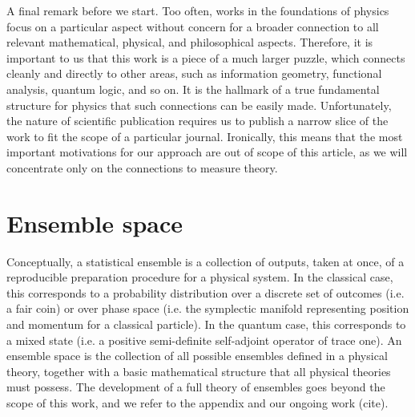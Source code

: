 \documentclass[10pt,twocolumn, nofootinbib]{revtex4-2}
\begin{document}
A final remark before we start. Too often, works in the foundations of physics focus on a particular aspect without concern for a broader connection to all relevant mathematical, physical, and philosophical aspects. Therefore, it is important to us that this work is a piece of a much larger puzzle, which connects cleanly and directly to other areas, such as information geometry, functional analysis, quantum logic, and so on. It is the hallmark of a true fundamental structure for physics that such connections can be easily made. Unfortunately, the nature of scientific publication requires us to publish a narrow slice of the work to fit the scope of a particular journal. Ironically, this means that the most important motivations for our approach are out of scope of this article, as we will concentrate only on the connections to measure theory.

\section{Ensemble space}

Conceptually, a statistical ensemble is a collection of outputs, taken at once, of a reproducible preparation procedure for a physical system. In the classical case, this corresponds to a probability distribution over a discrete set of outcomes (i.e. a fair coin) or over phase space (i.e. the symplectic manifold representing position and momentum for a classical particle). In the quantum case, this corresponds to a mixed state (i.e. a positive semi-definite self-adjoint operator of trace one). An ensemble space is the collection of all possible ensembles defined in a physical theory, together with a basic mathematical structure that all physical theories must possess. The development of a full theory of ensembles goes beyond the scope of this work, and we refer to the appendix and our ongoing work (cite).
\end{document}
